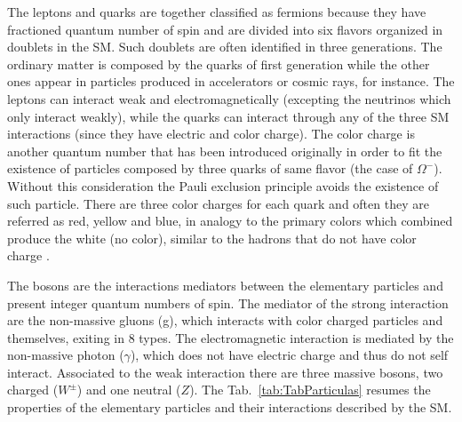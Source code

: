 The leptons and quarks are together classified as fermions because they have fractioned quantum number of spin and are divided into six flavors organized in doublets in the SM. Such doublets are often identified in three generations. The ordinary matter is composed by the quarks of first generation while the other ones appear in particles produced in accelerators or cosmic rays, for instance. The leptons can interact weak and electromagnetically (excepting the neutrinos which only interact weakly), while the quarks can interact through any of the three SM interactions (since they have electric and color charge). The color charge is another quantum number that has been introduced originally in order to fit the existence of particles composed by three quarks of same flavor (the case of $\Omega^-$). Without this consideration the Pauli exclusion principle avoids the existence of such particle. There are three color charges for each quark and often they are referred as red, yellow and blue, in analogy to the primary colors which combined produce the white (no color), similar to the hadrons that do not have color charge \cite{bib:griffiths-2008,bib:halzen-martin-1984}.

The bosons are the interactions mediators between the elementary particles and present integer quantum numbers of spin. The mediator of the strong interaction are the non-massive gluons (g), which interacts with color charged particles and themselves, exiting in 8 types. The electromagnetic interaction is mediated by the non-massive photon ($\gamma$), which does not have electric charge and thus do not self interact. Associated to the weak interaction there are three massive bosons, two charged ($W^{\pm}$) and one neutral ($Z$). The Tab.~\ref{tab:TabParticulas} resumes the properties of the elementary particles and their interactions described by the SM.

